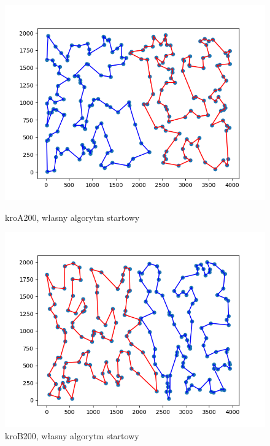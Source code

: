 \documentclass[11pt]{article}
\begin{document}
\begin{figure}[H]
    \vspace{0.5cm}

    \begin{minipage}[t]{0.45\textwidth}
        \centering
        \includegraphics[width=\linewidth]{best_paths/kroA200/traverse_steepest_vertex/split_paths_regret_TSP}
        \caption{kroA200, własny algorytm startowy}
    \end{minipage}
    \hfill
    \begin{minipage}[t]{0.45\textwidth}
        \centering
        \includegraphics[width=\linewidth]{best_paths/kroB200/traverse_steepest_vertex/split_paths_regret_TSP}
        \caption{kroB200, własny algorytm startowy}
    \end{minipage}
    \label{fig:minipage-steepest-vertex}
\end{figure}
\end{document}
